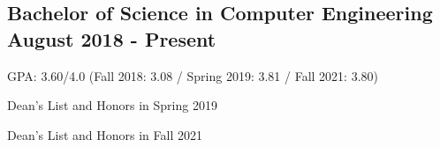 
\subsection{{Bachelor of Science in Computer Engineering} \hfill August 2018 - Present}
\begin{zitemize}
\item GPA: 3.60/4.0 (Fall 2018: 3.08 / Spring 2019: 3.81 / Fall 2021: 3.80)
\item Dean's List and Honors in Spring 2019
\item Dean's List and Honors in Fall 2021
\end{zitemize}



